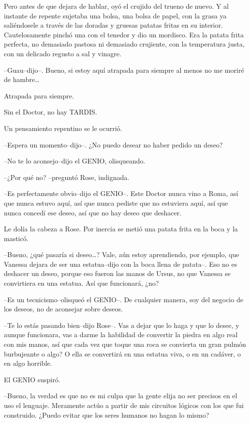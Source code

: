 Pero antes de que dejara de hablar, oyó el crujido del trueno de nuevo.
Y al instante de repente sujetaba una bolsa, una bolsa de papel, con la
grasa ya saliéndosele a través de las doradas y gruesas patatas fritas
en su interior. Cautelosamente pinchó una con el tenedor y dio un
mordisco. Era la patata frita perfecta, no demasiado pastosa ni
demasiado crujiente, con la temperatura justa, con un delicado regusto a
sal y vinagre.

--Guau--dijo--. Bueno, si estoy aquí atrapada para siempre al menos no
me moriré de hambre\ldots{}

Atrapada para siempre.

Sin el Doctor, no hay TARDIS.

Un pensamiento repentino se le ocurrió.

--Espera un momento--dijo--. ¿No puedo desear no haber pedido un deseo?

--No te lo aconsejo--dijo el GENIO, olisqueando.

--¿Por qué no? --preguntó Rose, indignada.

--Es perfectamente obvio--dijo el GENIO--. Este Doctor nunca vino a
Roma, así que nunca estuvo aquí, así que nunca pediste que no estuviera
aquí, así que nunca concedí ese deseo, así que no hay deseo que
deshacer.

Le dolía la cabeza a Rose. Por inercia se metió una patata frita en la
boca y la masticó.

--Bueno, ¿qué pasaría si deseo\ldots{}? Vale, aún estoy aprendiendo, por
ejemplo, que Vanessa dejara de ser una estatua--dijo con la boca llena
de patata--. Eso no es deshacer un deseo, porque eso fueron las manos de
Ursus, no que Vanessa se convirtiera en una estatua. Así que funcionará,
¿no?

--Es un tecnicismo--olisqueó el GENIO--. De cualquier manera, soy del
negocio de los deseos, no de aconsejar sobre deseos.

--Te lo estás pasando bien--dijo Rose--. Vas a dejar que lo haga y que
lo desee, y aunque funcionara, vas a darme la habilidad de convertir la
piedra en algo real con mis manos, así que cada vez que toque una roca
se convierta un gran pulmón burbujeante o algo? O ella se convertirá en
una estatua viva, o en un cadáver, o en algo horrible.

El GENIO suspiró.

--Bueno, la verdad es que no es mi culpa que la gente elija no ser
precisos en el uso el lenguaje. Meramente actúo a partir de mis
circuitos lógicos con los que fui construido. ¿Puedo evitar que los
seres humanos no hagan lo mismo?

